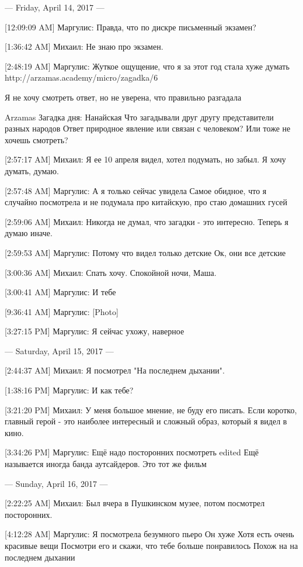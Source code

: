 \documentclass{article}
\begin{document}
--- Friday, April 14, 2017 ---

[12:09:09 AM] Маргулис:
Правда, что по дискре письменный экзамен?

[1:36:42 AM] Михаил:
Не знаю про экзамен.

[2:48:19 AM] Маргулис:
Жуткое ощущение, что я за этот год стала хуже думать
 http://arzamas.academy/micro/zagadka/6

Я не хочу смотреть ответ, но не уверена, что правильно разгадала

Arzamas
Загадка дня: Нанайская
Что загадывали друг другу представители разных народов
 Ответ природное явление или связан с человеком?
 Или тоже не хочешь смотреть?

[2:57:17 AM] Михаил:
Я ее 10 апреля видел, хотел подумать, но забыл. Я хочу думать, думаю.

[2:57:48 AM] Маргулис:
А я только сейчас увидела
 Самое обидное, что я случайно посмотрела и не подумала про китайскую, про стаю домашних гусей

[2:59:06 AM] Михаил:
Никогда не думал, что загадки - это интересно. Теперь я думаю иначе.

[2:59:53 AM] Маргулис:
Потому что видел только детские
 Ок, они все детские

[3:00:36 AM] Михаил:
Спать хочу. Спокойной ночи, Маша.

[3:00:41 AM] Маргулис:
И тебе

[9:36:41 AM] Маргулис:
[Photo]

[3:27:15 PM] Маргулис:
Я сейчас ухожу, наверное

--- Saturday, April 15, 2017 ---

[2:44:37 AM] Михаил:
Я посмотрел "На последнем дыхании".

[1:38:16 PM] Маргулис:
И как тебе?

[3:21:20 PM] Михаил:
У меня большое мнение, не буду его писать. Если коротко, главный герой - это наиболее интересный и сложный образ, который я видел в кино.

[3:34:26 PM] Маргулис:
Ещё надо посторонних посмотреть
edited 
Ещё называется иногда банда аутсайдеров. Это тот же фильм

--- Sunday, April 16, 2017 ---

[2:22:25 AM] Михаил:
Был вчера в Пушкинском музее, потом посмотрел посторонних.

[4:12:28 AM] Маргулис:
Я посмотрела безумного пьеро
 Он хуже
 Хотя есть очень красивые вещи
 Посмотри его и скажи, что тебе больше понравилось
 Похож на на последнем дыхании
\end{document}
